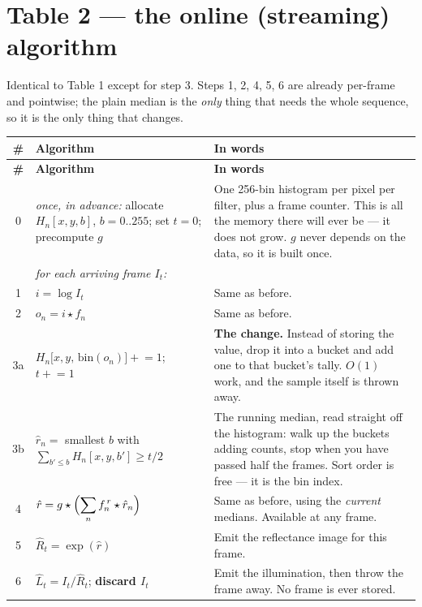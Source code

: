 \documentclass[11pt]{article}
\begin{document}
\section{Table 2 --- the online (streaming) algorithm}

Identical to Table 1 except for step 3. Steps 1, 2, 4, 5, 6 are already per-frame and pointwise; the plain
median is the \emph{only} thing that needs the whole sequence, so it is the only thing that changes.

\renewcommand{\arraystretch}{1.45}
\begin{longtable}{@{}c L{5.9cm} L{8.2cm}@{}}
\toprule
\textbf{\#} & \textbf{Algorithm} & \textbf{In words} \\
\midrule
\endfirsthead
\toprule
\textbf{\#} & \textbf{Algorithm} & \textbf{In words} \\
\midrule
{} & \emph{once, in advance:} allocate $H_n[x,y,b]$, $b=0..255$; \; set $t=0$; \; precompute $g$
  & One 256-bin histogram per pixel per filter, plus a frame counter. This is all the memory there will ever
    be --- it does not grow. $g$ never depends on the data, so it is built once. \\
\midrule
  & \emph{for each arriving frame $I_t$:} & \\
1 & $i = \log I_t$ & Same as before. \\
2 & $o_n = i \star f_n$ & Same as before. \\
3a & $H_n\bigl[x,y,\,\mathrm{bin}(o_n)\bigr] \mathrel{+}= 1$; \quad $t \mathrel{+}= 1$
  & \textbf{The change.} Instead of storing the value, drop it into a bucket and add one to that bucket's
    tally. $O(1)$ work, and the sample itself is thrown away. \\
3b & $\hat r_n = $ smallest $b$ with $\sum_{b'\le b} H_n[x,y,b'] \ge t/2$
  & The running median, read straight off the histogram: walk up the buckets adding counts, stop when you have
    passed half the frames. Sort order is free --- it is the bin index. \\
4 & $\displaystyle \hat r = g \star \Bigl( \sum_n f^{\,r}_n \star \hat r_n \Bigr)$ & Same as before, using the
    \emph{current} medians. Available at any frame. \\
5 & $\hat R_t = \exp(\hat r)$ & Emit the reflectance image for this frame. \\
6 & $\hat L_t = I_t / \hat R_t$; \; \textbf{discard $I_t$} & Emit the illumination, then throw the frame away.
    No frame is ever stored. \\
\bottomrule
\end{longtable}
\renewcommand{\arraystretch}{1}
\end{document}
